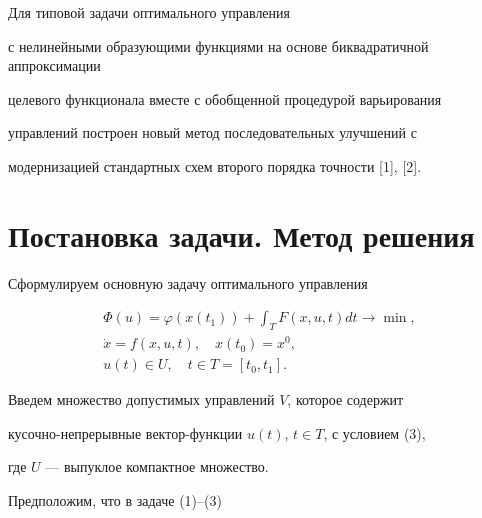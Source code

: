 

\maketitle


\label{begin}














Для типовой задачи оптимального управления 


с нелинейными образующими функциями на основе биквадратичной аппроксимации


целевого функционала вместе с обобщенной процедурой варьирования


управлений построен новый метод последовательных улучшений с


модернизацией стандартных схем второго порядка точности [1], [2].








\section{Постановка задачи. Метод решения}





Сформулируем основную задачу оптимального управления


\begin{gather}


\Phi(u)=\varphi(x(t_1))+\int_TF(x,u,t)dt\rightarrow \min, \\


\Dot{x}=f(x,u,t),\quad x(t_0)=x^0, \\


u(t)\in U,\quad t\in T=[t_0,t_1].


\end{gather} 


Введем множество допустимых управлений $V$, которое содержит 


кусочно-непрерывные вектор-функции $u(t)$, $t\in T$, с условием (3), 


где $U$ --- выпуклое компактное множество.





Предположим, что в задаче (1)--(3)


